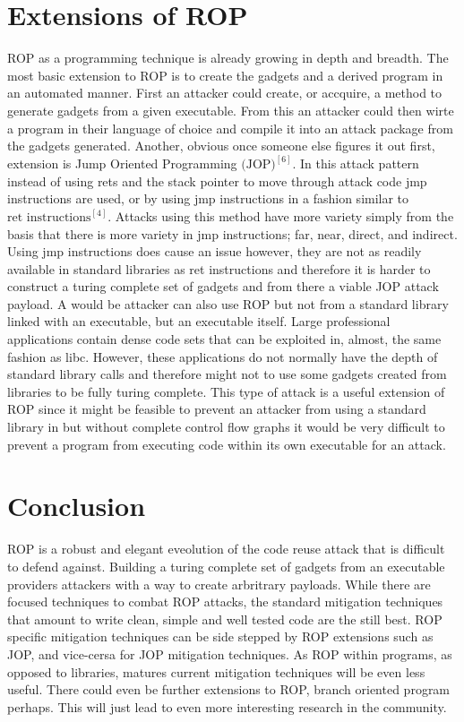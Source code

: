 \documentclass[11pt]{amsart}
\begin{document}
\section*{Extensions of ROP}
ROP as a programming technique is already growing in depth and breadth. The most basic extension to ROP is to create the gadgets and a derived program in an automated manner. First an attacker could create, or accquire, a method to generate gadgets from a given executable. From this an attacker could then wirte a program in their language of choice and compile it into an attack package from the gadgets generated.\newline \newline
Another, obvious once someone else figures it out first, extension is Jump Oriented Programming $\text{(JOP)}^{[6]}$. In this attack pattern instead of using rets and the stack pointer to move through attack code jmp instructions are used, or by using jmp instructions in a fashion similar to  $\text{ret instructions}^{[4]}$. Attacks using this method have more variety simply from the basis that there is more variety in jmp instructions; far, near, direct, and indirect. Using jmp instructions does cause an issue however, they are not as readily available in standard libraries as ret instructions and therefore it is harder to construct a turing complete set of gadgets and from there a viable JOP attack payload.\newline \newline
A would be attacker can also use ROP but not from a standard library linked with an executable, but an executable itself. Large professional applications contain dense code sets that can be exploited in, almost, the same fashion as libc. However, these applications do not normally have the depth of standard library calls and therefore might not to use some gadgets created from libraries to be fully turing complete. This type of attack is a useful extension of ROP since it might be feasible to prevent an attacker from using a standard library in but without complete control flow graphs it would be very difficult to prevent a program from executing code within its own executable for an attack.
\section*{Conclusion}
ROP is a robust and elegant eveolution of the code reuse attack that is difficult to defend against. Building a turing complete set of gadgets from an executable providers attackers with a way to create arbritrary payloads.  While there are focused techniques to combat ROP attacks, the standard mitigation techniques that amount to write clean, simple and well tested code are the still best. ROP specific mitigation techniques can be side stepped by ROP extensions such as JOP, and vice-cersa for JOP mitigation techniques. As ROP within programs, as opposed to libraries, matures current mitigation techniques will be even less useful. There could even be further extensions to ROP, branch oriented program perhaps.  This will just lead to even more interesting research in the community.
\end{document}
